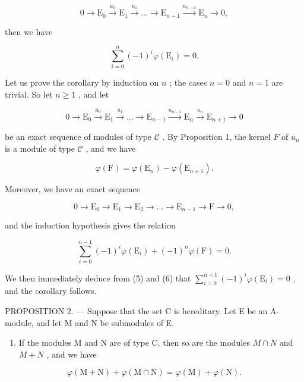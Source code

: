 \[
0 \longrightarrow \mathrm{E} _ {0} \stackrel {u _ {0}} {\longrightarrow} \mathrm{E} _ {1} \stackrel {u _ {1}} {\longrightarrow} \dots \longrightarrow \mathrm{E} _ {n - 1} \stackrel {u _ {n - 1}} {\longrightarrow} \mathrm{E} _ {n} \longrightarrow 0,
\]

then we have

\[
\sum_ {i = 0} ^ {n} (- 1) ^ {i} \varphi (\mathrm{E} _ {i}) = 0.\tag{4}
\]

Let us prove the corollary by induction on \(n\) ; the cases \(n = 0\) and \(n = 1\) are trivial. So let \(n \geqslant 1\) , and let

\[
0 \longrightarrow \mathrm{E} _ {0} \stackrel {u _ {0}} {\longrightarrow} \mathrm{E} _ {1} \stackrel {u _ {1}} {\longrightarrow} \dots \longrightarrow \mathrm{E} _ {n - 1} \stackrel {u _ {n - 1}} {\longrightarrow} \mathrm{E} _ {n} \stackrel {u _ {n}} {\longrightarrow} \mathrm{E} _ {n + 1} \longrightarrow 0
\]

be an exact sequence of modules of type \(\mathcal{C}\) . By Proposition 1, the kernel \(F\) of \(u_{n}\) is a module of type \(\mathcal{C}\) , and we have

\[
\varphi (\mathrm{F}) = \varphi (\mathrm{E} _ {n}) - \varphi (\mathrm{E} _ {n + 1}).\tag{5}
\]

Moreover, we have an exact sequence

\[
0 \longrightarrow \mathrm{E} _ {0} \longrightarrow \mathrm{E} _ {1} \longrightarrow \mathrm{E} _ {2} \longrightarrow \dots \longrightarrow \mathrm{E} _ {n - 1} \longrightarrow \mathrm{F} \longrightarrow 0,
\]

and the induction hypothesis gives the relation

\[
\sum_ {i = 0} ^ {n - 1} (- 1) ^ {i} \varphi (\mathrm{E} _ {i}) + (- 1) ^ {n} \varphi (\mathrm{F}) = 0.\tag{6}
\]

We then immediately deduce from (5) and (6) that \(\sum_{i=0}^{n+1}(-1)^{i}\varphi(\mathrm{E}_{i}) = 0\) , and the corollary follows.

PROPOSITION 2. --- Suppose that the set C is hereditary. Let E be an A-module, and let M and N be submodules of E.

\begin{enumerate}
\def\labelenumi{\alph{enumi})}
\tightlist
\item
  If the modules M and N are of type C, then so are the modules \(M \cap N\) and \(M + N\) , and we have
\end{enumerate}

\[
\varphi (\mathrm{M} + \mathrm{N}) + \varphi (\mathrm{M} \cap \mathrm{N}) = \varphi (\mathrm{M}) + \varphi (\mathrm{N}).
\]

